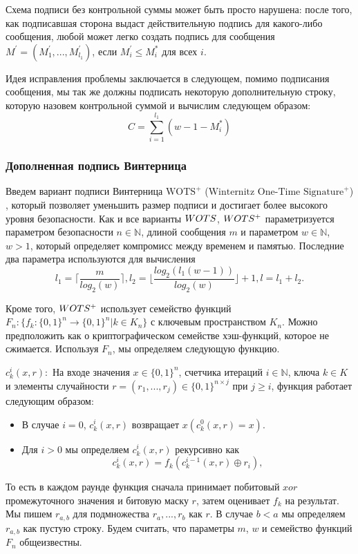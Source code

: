 \documentclass[a4paper, 14pt]{extarticle}
\begin{document}
Схема подписи без контрольной суммы может быть просто нарушена: после того, как подписавшая сторона выдаст действительную подпись для какого-либо сообщения, любой может легко создать подпись для сообщения $M^{'} = (M^{'}_1, ..., M^{'}_{l_{1}})$, если $M^{'}_{i} \leq M^{*}_{i}$ для всех $i$.

Идея исправления проблемы заключается в следующем, помимо подписания сообщения, мы так же должны подписать некоторую дополнительную строку, которую назовем контрольной суммой и вычислим следующем образом:
\[ C = \sum^{l_{1}}_{i = 1}(w - 1 - M^{*}_{i}) \]

\subsubsection{Дополненная подпись Винтерница}
Введем вариант подписи Винтерница $\text{WOTS}^{+}$ ($\text{Winternitz One-Time Signature}^+$) \cite{wotsplus}, который позволяет уменьшить размер подписи и достигает более высокого уровня безопасности. Как и все варианты $W\-OTS$, $W\-OTS^{+}$ параметризуется параметром безопасности $n \in \mathbb{N}$, длиной сообщения $m$ и параметром $w \in \mathbb{N}$, $w > 1$, который определяет компромисс между временем и памятью. Последние два параметра используются для вычисления
\[ l_{1} = \Bigg \lceil \frac{m}{log_{2}(w)} \Bigg \rceil, l_{2} = \Bigg \lfloor \frac{log_{2}(l_{1}(w - 1))}{log_{2}(w)} \Bigg \rfloor + 1, l = l_{1} + l_{2}. \]

Кроме того, $W\-OTS^{+}$ использует семейство функций $F_{n} : \{f_{k} : \{0, 1\}^{n} \rightarrow \{0, 1\}^{n}|k \in K_{n}\}$ с ключевым пространством $K_{n}$. Можно предположить как о криптографическом семействе хэш-функций, которое не сжимается. Используя $F_{n}$, мы определяем следующую функцию.

$c^{i}_{k}(x, r):$ На входе значения $x \in \{0, 1\}^{n}$, счетчика итераций $i \in \mathbb{N}$, ключа $k \in K$ и элементы случайности $r = (r_{1}, ..., r_{j}) \in \{0, 1\}^{n \times j}$ при $j \geq i$, функция работает следующим образом:

\begin{itemize}
    \item В случае $i = 0$, $c^{i}_{k}(x, r)$ возвращает $x(c^{0}_{k}(x, r) = x)$.
    \item Для $i > 0$ мы определяем $c^{i}_{k}(x, r)$ рекурсивно как
    \[ c^{i}_{k}(x, r) = f_{k}(c^{i - 1}_{k}(x, r) \oplus r_{i}) ,\]
\end{itemize}

То есть в каждом раунде функция сначала принимает побитовый $xor$ промежуточного значения и битовую маску $r$, затем оценивает $f_{k}$ на результат. Мы пишем $r_{a,b}$ для подмножества $r_{a}, ..., r_{b}$ как $r$. В случае $b < a$ мы определяем $r_{a,b}$ как пустую строку. Будем считать, что параметры $m$, $w$ и семейство функций $F_{n}$ общеизвестны.
\end{document}
